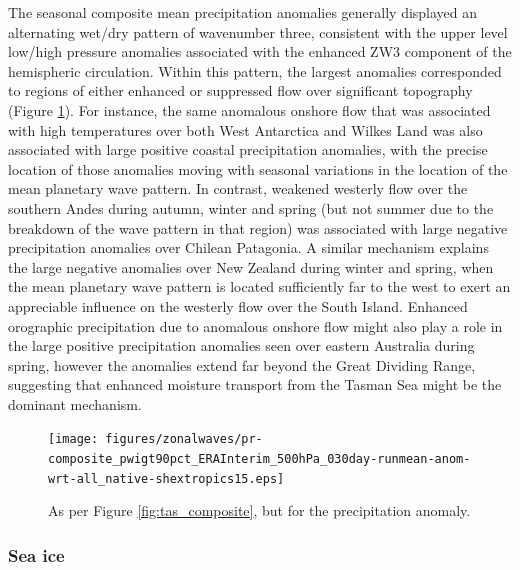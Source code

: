 The seasonal composite mean precipitation anomalies generally displayed an alternating wet/dry pattern of wavenumber three, consistent with the upper level low/high pressure anomalies associated with the enhanced ZW3 component of the hemispheric circulation. Within this pattern, the largest anomalies corresponded to regions of either enhanced or suppressed flow over significant topography (Figure \ref{fig:pr_composite}). For instance, the same anomalous onshore flow that was associated with high temperatures over both West Antarctica and Wilkes Land was also associated with large positive coastal precipitation anomalies, with the precise location of those anomalies moving with seasonal variations in the location of the mean planetary wave pattern. In contrast, weakened westerly flow over the southern Andes during autumn, winter and spring (but not summer due to the breakdown of the wave pattern in that region) was associated with large negative precipitation anomalies over Chilean Patagonia. A similar mechanism explains the large negative anomalies over New Zealand during winter and spring, when the mean planetary wave pattern is located sufficiently far to the west to exert an appreciable influence on the westerly flow over the South Island. Enhanced orographic precipitation due to anomalous onshore flow might also play a role in the large positive precipitation anomalies seen over eastern Australia during spring, however the anomalies extend far beyond the Great Dividing Range, suggesting that enhanced moisture transport from the Tasman Sea might be the dominant mechanism. 

\begin{figure}
\begin{center}
\texttt{[image: figures/zonalwaves/pr-composite\_pwigt90pct\_ERAInterim\_500hPa\_030day-runmean-anom-wrt-all\_native-shextropics15.eps]}
\caption[As per Figure \ref{fig:tas_composite}, but for the precipitation anomaly]{\label{fig:pr_composite}
As per Figure \ref{fig:tas_composite}, but for the precipitation anomaly.}
\end{center}
\end{figure}


\subsubsection{Sea ice}

